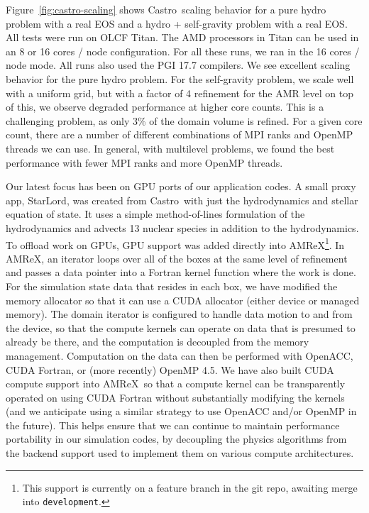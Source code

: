 \documentclass[a4paper]{jpconf}
\newcommand{\castro}{{\sffamily Castro}}
\newcommand{\starlord}{{\sffamily StarLord}}
\newcommand{\amrex}{{\sffamily AMReX}}
\newcommand{\MarginPar}[1]{\marginpar{\vskip-\baselineskip\raggedright\tiny\sffamily\hrule\smallskip{\color{red}#1}\par\smallskip\hrule}}
\begin{document}
Figure~\ref{fig:castro-scaling} shows \castro\ scaling behavior for a
pure hydro problem with a real EOS and a hydro + self-gravity problem
with a real EOS.  All tests were run on OLCF Titan.  The AMD
processors in Titan can be used in an 8 or 16 cores / node
configuration.  For all these runs, we ran in the 16 cores / node
mode.  All runs also used the PGI 17.7 compilers.  We see excellent
scaling behavior for the pure hydro problem.  For the self-gravity
problem, we scale well with a uniform grid, but with a factor of 4
refinement for the AMR level on top of this, we observe degraded
performance at higher core counts.  This is a challenging problem, as
only 3\% of the domain volume is refined.  For a given core count,
there are a number of different combinations of MPI ranks and OpenMP
threads we can use.  In general, with multilevel problems, we found
the best performance with fewer MPI ranks and more OpenMP threads.

Our latest focus has been on GPU ports of our application codes.  A
small proxy app, \starlord, was created from \castro\ with just the
hydrodynamics and stellar equation of state.  It uses a simple
method-of-lines formulation of the hydrodynamics and advects 13
nuclear species in addition to the hydrodynamics.  To offload work on
GPUs, GPU support was added directly into \amrex\footnote{This support
  is currently on a feature branch in the git repo, awaiting merge
  into {\tt development}.}.  In \amrex, an iterator loops over all of
the boxes at the same level of refinement and passes a data pointer
into a Fortran kernel function where the work is done. For the
simulation state data that resides in each box, we have modified the
memory allocator so that it can use a CUDA allocator (either device or
managed memory).  The domain iterator is configured to handle data
motion to and from the device, so that the compute kernels can operate
on data that is presumed to already be there, and the computation is
decoupled from the memory management. Computation on the data can then
be performed with OpenACC, CUDA Fortran, or (more recently) OpenMP
4.5. We have also built CUDA compute support into \amrex\ so that a
compute kernel can be transparently operated on using CUDA Fortran
without substantially modifying the kernels (and we anticipate using a
similar strategy to use OpenACC and/or OpenMP in the future). This
helps ensure that we can continue to maintain performance portability
in our simulation codes, by decoupling the physics algorithms from the
backend support used to implement them on various compute
architectures.\MarginPar{add CPU time for reference}
\end{document}
